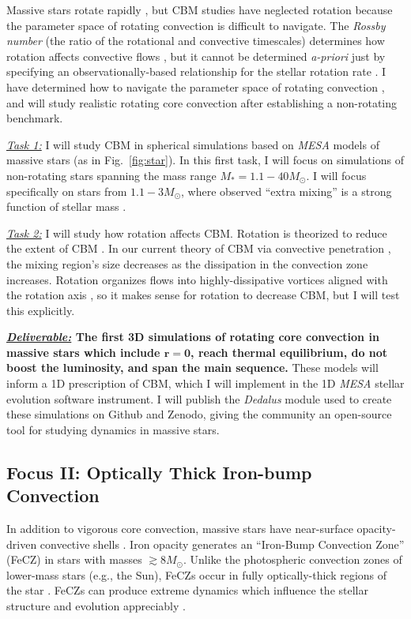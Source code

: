 \documentclass[12pt]{article} %
\begin{document}
Massive stars rotate rapidly \citep{jermyn_etal_2022_atlas}, but CBM studies have neglected rotation because the parameter space of rotating convection is difficult to navigate.
The \emph{Rossby number} (the ratio of the rotational and convective timescales) determines how rotation affects convective flows \citep{aurnou_etal_2020}, but it cannot be determined \emph{a-priori} just by specifying an observationally-based relationship for the stellar rotation rate \citep{glebocki_gnacinski_2005,ramirezagudelo_etal_2013,nielsen_etal_2013}.
I have determined how to navigate the parameter space of rotating convection \citep{anders_etal_2019_rot}, and will study realistic rotating core convection after establishing a non-rotating benchmark.

\emph{\underline{Task 1:}}
I will study CBM in spherical simulations based on \emph{MESA} models of massive stars (as in Fig.~\ref{fig:star}).
In this first task, I will focus on simulations of non-rotating stars spanning the mass range $M_* = 1.1-40 M_{\odot}$.
I will focus specifically on stars from $1.1-3 M_{\odot}$, where observed ``extra mixing'' is a strong function of stellar mass \citep[][Fig.~\ref{fig:intro}, middle]{claret_torres_2019}.

\emph{\underline{Task 2:}} I will study how rotation affects CBM.
Rotation is theorized to reduce the extent of CBM \citep{augustson_mathis_2019}.
In our current theory of CBM via convective penetration \citep{anders_etal_2022a}, the mixing region's size decreases as the dissipation in the convection zone increases.
Rotation organizes flows into highly-dissipative vortices aligned with the rotation axis \citep{julien_etal_1996}, so it makes sense for rotation to decrease CBM, but I will test this explicitly.

\textbf{\underline{\emph{Deliverable:}} The first 3D simulations of rotating core convection in massive stars which include $\boldsymbol{r = 0}$, reach thermal equilibrium, do not boost the luminosity, and span the main sequence.}
These models will inform a 1D prescription of CBM, which I will implement in the 1D \emph{MESA} stellar evolution software instrument.
I will publish the \emph{Dedalus} module used to create these simulations on Github and Zenodo, giving the community an open-source tool for studying dynamics in massive stars. 




\subsection{Focus II: Optically Thick Iron-bump Convection} \vspace{-0.15cm}
In addition to vigorous core convection, massive stars have near-surface opacity-driven convective shells \citep{cantiello_etal_2009}.
Iron opacity generates an ``Iron-Bump Convection Zone'' (FeCZ) in stars with masses $\gtrsim 8 M_{\odot}$.
Unlike the photospheric convection zones of lower-mass stars (e.g., the Sun), FeCZs occur in fully optically-thick regions of the star \citep{jermyn_etal_2022_atlas}.
FeCZs can produce extreme dynamics which influence the stellar structure and evolution appreciably \citep{schultz_etal_2022b}.
\end{document}
